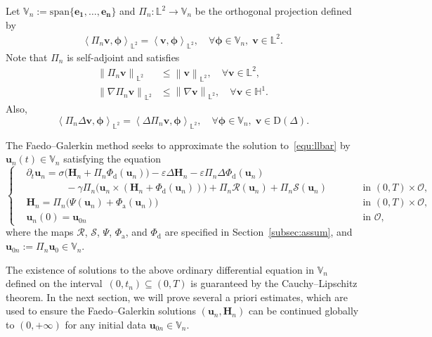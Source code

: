 \documentclass[11pt, reqno]{amsart}
\theoremstyle{definition}
\numberwithin{equation}{section}
\newcommand{\bff}{\boldsymbol}
\newcommand{\bb}{\mathbb}
\newcommand{\norm}[2]{\left\|{#1}\right\|_{#2}}
\newcommand{\inpro}[2]{\left\langle#1,#2\right\rangle}
\begin{document}
Let $\bb{V}_n:= \text{span}\{\bff{e_1},\ldots,\bff{e_n}\}$ and $\Pi_n: \bb{L}^2\to
\bb{V}_n$ be the orthogonal projection defined by
\begin{align*}
	\inpro{ \Pi_n \bff{v}}{\bff{\phi}}_{\bb{L}^2}
	= 
	\inpro{ \bff{v}}{\bff{\phi}}_{\bb{L}^2},
	\quad \forall \bff{\phi}\in \bb{V}_n,
	\;\bff{v}\in\bb{L}^2.
\end{align*}
Note that $\Pi_n$ is self-adjoint and satisfies
\begin{align*}
	\norm{\Pi_n \bff{v}}{\bb{L}^2} 
	&\leq 
	\norm{\bff{v}}{\bb{L}^2},
	\quad \forall
	\bff{v}\in \bb{L}^2,
	\\
	\norm{\nabla \Pi_n \bff{v}}{\bb{L}^2}
	&\leq
	\norm{\nabla \bff{v}}{\bb{L}^2},
	\quad \forall
	\bff{v} \in \bb{H}^1.
\end{align*}
Also,
\begin{equation*}
	\inpro{\Pi_n \Delta \bff{v}}{\bff{\phi}}_{\bb{L}^2}
	=
	\inpro{\Delta \Pi_n \bff{v}}{\bff{\phi}}_{\bb{L}^2},
	\quad \forall
	\bff{\phi}\in \bb{V}_n,\;
	\bff{v}\in \text{D}(\Delta).
\end{equation*}

The Faedo--Galerkin method seeks to approximate the solution 
to~\eqref{equ:llbar} by~$\bff{u}_n(t) \in \bb{V}_n$ satisfying the equation
\begin{equation}\label{equ:faedo}
	\left\{
	\begin{alignedat}{2}
		&\partial_t \bff{u}_n
		=
		\sigma \big(\bff{H}_n+\Pi_n\Phi_{\mathrm{d}}(\bff{u}_n)\big)
		-
		\varepsilon \Delta \bff{H}_n 
		- 
		\varepsilon\Pi_n \Delta \Phi_{\mathrm{d}}(\bff{u}_n)
        &&
        \\
		&\qquad\qquad
        -
		\gamma \Pi_n \big(\bff{u}_n \times (\bff{H}_n+\Phi_{\mathrm{d}}(\bff{u}_n))\big)
		+
		\Pi_n \mathcal{R}(\bff{u}_n)
        +
        \Pi_n \mathcal{S}(\bff{u}_n)
		&&
		\qquad\text{in $(0,T)\times\mathscr{O}$,}
		\\
		&\bff{H}_n
		=
		\Pi_n \big(\Psi(\bff{u}_n)
		+
		\Phi_{\mathrm{a}}(\bff{u}_n)\big)
		&&
		\qquad\text{in $(0,T)\times\mathscr{O}$,}
		\\
		&\bff{u}_n(0) = \bff{u}_{0n}
		&& \qquad\text{in $\mathscr{O}$,}
	\end{alignedat}
	\right.
\end{equation}
where the maps $\mathcal{R}$, $\mathcal{S}$, $\Psi$, $\Phi_{\mathrm{a}}$, and $\Phi_{\mathrm{d}}$ are specified in Section~\ref{subsec:assum}, and~$\bff{u}_{0n}:= \Pi_n \bff{u}_0 \in \bb{V}_n$.

The existence of solutions to the above ordinary differential equation in $\bb{V}_n$ defined on the interval~$(0, t_n)\subseteq (0,T)$ is guaranteed by the Cauchy--Lipschitz theorem. In the next section, we will prove several a priori estimates, which are used to ensure the Faedo--Galerkin solutions $(\bff{u}_n, \bff{H}_n)$ can be continued globally to $(0,+\infty)$ for any initial data $\bff{u}_{0n}\in \bb{V}_n$.
\end{document}
